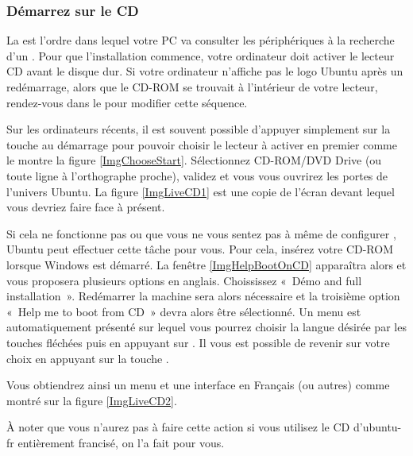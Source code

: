 \subsubsection{Démarrez sur le CD}
La  est l'ordre dans lequel votre PC va consulter les périphériques à la recherche d'un . Pour que l'installation commence, votre ordinateur doit activer le lecteur CD avant le disque dur. Si votre ordinateur n'affiche pas le logo Ubuntu après un redémarrage, alors que le CD-ROM se trouvait à l'intérieur de votre lecteur, rendez-vous dans le   pour modifier cette séquence.\par
{}
Sur les ordinateurs récents, il est souvent possible d'appuyer simplement sur la touche  au démarrage pour pouvoir choisir le lecteur à activer en premier comme le montre la figure \ref{ImgChooseStart}. Sélectionnez CD-ROM/DVD Drive (ou toute ligne à l'orthographe proche), validez et vous vous ouvrirez les portes de l'univers Ubuntu. La figure \ref{ImgLiveCD1} est une copie de l'écran devant lequel vous devriez faire face à présent.\par
Si cela ne fonctionne pas ou que vous ne vous sentez pas à même de configurer , Ubuntu peut effectuer cette tâche pour vous. Pour cela, insérez votre CD-ROM lorsque Windows est démarré. La fenêtre \ref{ImgHelpBootOnCD} apparaîtra alors et vous proposera plusieurs options en anglais. Choississez «~Démo and full installation~». Redémarrer la machine sera alors nécessaire et la troisième option «~Help me to boot from CD~» devra alors être sélectionné.
Un menu est automatiquement présenté sur lequel vous pourrez choisir la langue désirée par les touches fléchées puis en appuyant sur . Il vous est possible de revenir sur votre choix en appuyant sur la touche .\par
Vous obtiendrez ainsi un menu et une interface en Français (ou autres) comme montré sur la figure \ref{ImgLiveCD2}.\par
\ChoixDebutInstall
À noter que vous n'aurez pas à faire cette action si vous utilisez le CD d'ubuntu-fr entièrement francisé, on l'a fait pour vous.
